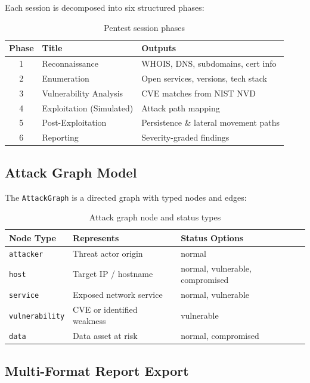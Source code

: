 \documentclass[12pt,a4paper]{article}
\begin{document}
Each session is decomposed into six structured phases:

\begin{table}[H]
\centering
\caption{Pentest session phases}
\begin{tabular}{cll}
\toprule
\textbf{Phase} & \textbf{Title} & \textbf{Outputs} \\
\midrule
1 & Reconnaissance       & WHOIS, DNS, subdomains, cert info \\
2 & Enumeration          & Open services, versions, tech stack \\
3 & Vulnerability Analysis & CVE matches from NIST NVD \\
4 & Exploitation (Simulated) & Attack path mapping \\
5 & Post-Exploitation    & Persistence \& lateral movement paths \\
6 & Reporting            & Severity-graded findings \\
\bottomrule
\end{tabular}
\end{table}

\subsection{Attack Graph Model}

The \texttt{AttackGraph} is a directed graph with typed nodes and edges:

\begin{table}[H]
\centering
\caption{Attack graph node and status types}
\begin{tabular}{lll}
\toprule
\textbf{Node Type} & \textbf{Represents} & \textbf{Status Options} \\
\midrule
\texttt{attacker}      & Threat actor origin     & normal \\
\texttt{host}          & Target IP / hostname    & normal, vulnerable, compromised \\
\texttt{service}       & Exposed network service & normal, vulnerable \\
\texttt{vulnerability} & CVE or identified weakness & vulnerable \\
\texttt{data}          & Data asset at risk      & normal, compromised \\
\bottomrule
\end{tabular}
\end{table}

\subsection{Multi-Format Report Export}
\end{document}
